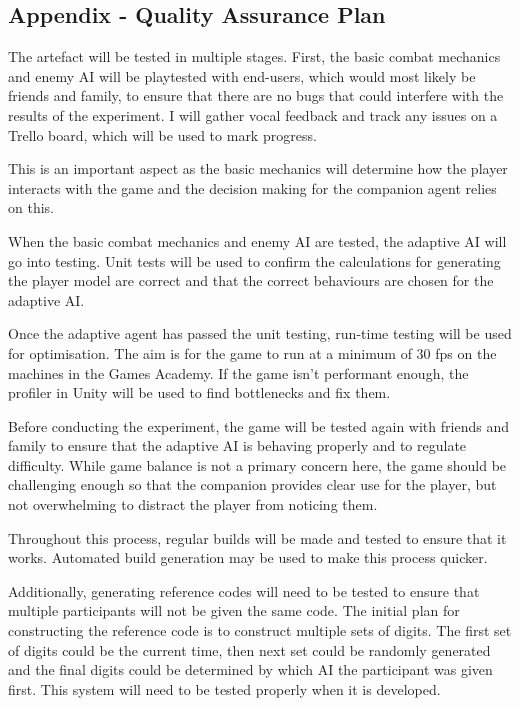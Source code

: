 \documentclass{IEEEtran}
\begin{document}
\subsection{Appendix - Quality Assurance Plan}
\label{AppendixQAPlan}


The artefact will be tested in multiple stages. First, the basic combat mechanics and enemy AI will be playtested with end-users, which would most likely be friends and family, to ensure that there are no bugs that could interfere with the results of the experiment. I will gather vocal feedback and track any issues on a Trello board, which will be used to mark progress.

This is an important aspect as the basic mechanics will determine how the player interacts with the game and the decision making for the companion agent relies on this.

When the basic combat mechanics and enemy AI are tested, the adaptive AI will go into testing. Unit tests will be used to confirm the calculations for generating the player model are correct and that the correct behaviours are chosen for the adaptive AI.

Once the adaptive agent has passed the unit testing, run-time testing will be used for optimisation. The aim is for the game to run at a minimum of 30 fps on the machines in the Games Academy. If the game isn't performant enough, the profiler in Unity will be used to find bottlenecks and fix them.

Before conducting the experiment, the game will be tested again with friends and family to ensure that the adaptive AI is behaving properly and to regulate difficulty. While game balance is not a primary concern here, the game should be challenging enough so that the companion provides clear use for the player, but not overwhelming to distract the player from noticing them.

Throughout this process, regular builds will be made and tested to ensure that it works. Automated build generation may be used to make this process quicker.

Additionally, generating reference codes will need to be tested to ensure that multiple participants will not be given the same code. The initial plan for constructing the reference code is to construct multiple sets of digits. The first set of digits could be the current time, then next set could be randomly generated and the final digits could be determined by which AI the participant was given first. This system will need to be tested properly when it is developed.
\end{document}
